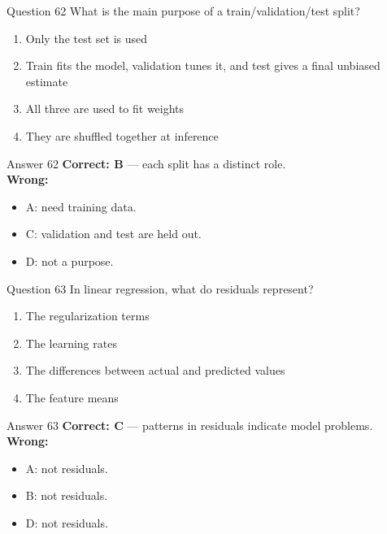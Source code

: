\documentclass[aspectratio=169,11pt]{beamer}
\begin{document}
\begin{frame}{Question 62}
What is the main purpose of a train/validation/test split?
\begin{enumerate}[label=\Alph*.]
\item Only the test set is used
\item Train fits the model, validation tunes it, and test gives a final unbiased estimate
\item All three are used to fit weights
\item They are shuffled together at inference
\end{enumerate}
\end{frame}
\begin{frame}{Answer 62}
\textbf{Correct: B} --- each split has a distinct role.\\
\vspace{0.5em}
\textbf{Wrong:}
\begin{itemize}
\item A: need training data.
\item C: validation and test are held out.
\item D: not a purpose.
\end{itemize}
\end{frame}

\begin{frame}{Question 63}
In linear regression, what do residuals represent?
\begin{enumerate}[label=\Alph*.]
\item The regularization terms
\item The learning rates
\item The differences between actual and predicted values
\item The feature means
\end{enumerate}
\end{frame}
\begin{frame}{Answer 63}
\textbf{Correct: C} --- patterns in residuals indicate model problems.\\
\vspace{0.5em}
\textbf{Wrong:}
\begin{itemize}
\item A: not residuals.
\item B: not residuals.
\item D: not residuals.
\end{itemize}
\end{frame}
\end{document}
